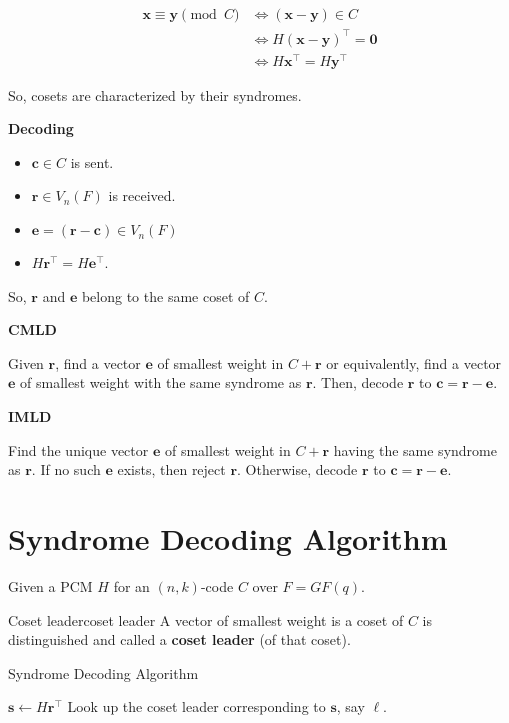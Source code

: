 \begin{Proof}{}{}
    \begin{align*}
        \symbf{x}\equiv \symbf{y}\pmod{C}
         & \iff (\symbf{x}-\symbf{y})\in C            \\
         & \iff H(\symbf{x}-\symbf{y})^\top=\symbf{0} \\
         & \iff H\symbf{x}^\top=H\symbf{y}^\top
    \end{align*}
\end{Proof}
So, cosets are characterized by their syndromes.

\textbf{Decoding}
\begin{itemize}
    \item $ \symbf{c}\in C $ is sent.
    \item $ \symbf{r}\in V_n(F) $ is received.
    \item $ \symbf{e}=(\symbf{r}-\symbf{c})\in V_n(F) $
    \item $ H\symbf{r}^\top=H\symbf{e}^\top $.
\end{itemize}
So, $ \symbf{r} $ and $ \symbf{e} $ belong to the same coset of $ C $.

\textbf{CMLD}

Given $ \symbf{r} $, find a vector $ \symbf{e} $ of smallest weight in $ C+\symbf{r} $
or equivalently, find a vector $ \symbf{e} $ of smallest weight with the same
syndrome as $ \symbf{r} $. Then, decode $ \symbf{r} $ to $ \symbf{c}=\symbf{r}-\symbf{e} $.

\textbf{IMLD}

Find the unique vector $ \symbf{e} $ of smallest weight in $ C+\symbf{r} $
having the same syndrome as $ \symbf{r} $.
If no such $ \symbf{e} $ exists, then reject $ \symbf{r} $.
Otherwise, decode $ \symbf{r} $ to $ \symbf{c}=\symbf{r}-\symbf{e} $.

\section{Syndrome Decoding Algorithm}
Given a PCM $ H $ for an $ (n,k) $-code $ C $ over $ F=GF(q) $.

\begin{Definition}{Coset leader}{coset leader}
    A vector of smallest weight is a coset of $ C $ is distinguished and called
    a \textbf{coset leader} (of that coset).
\end{Definition}

\begin{algorithm}
    \DontPrintSemicolon{}
    \caption{Syndrome Decoding Algorithm}

    $ \symbf{s}\gets H\symbf{r}^\top $\;
    Look up the coset leader corresponding to $ \symbf{s} $, say $ \symbf{\ell} $.\;
\end{algorithm}


